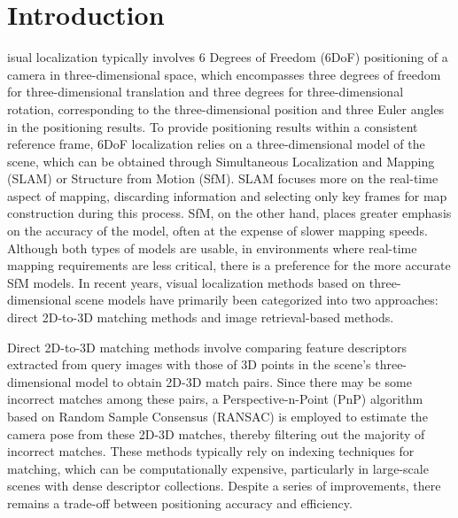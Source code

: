 \documentclass[journal]{IEEEtran}
\begin{document}
\section{Introduction}
isual localization typically involves 6 Degrees of Freedom (6DoF) positioning of a camera in three-dimensional space, which encompasses three degrees of freedom for three-dimensional translation and three degrees for three-dimensional rotation, corresponding to the three-dimensional position and three Euler angles in the positioning results. To provide positioning results within a consistent reference frame, 6DoF localization relies on a three-dimensional model of the scene, which can be obtained through Simultaneous Localization and Mapping (SLAM) or Structure from Motion (SfM). SLAM focuses more on the real-time aspect of mapping, discarding information and selecting only key frames for map construction during this process. SfM, on the other hand, places greater emphasis on the accuracy of the model, often at the expense of slower mapping speeds. Although both types of models are usable, in environments where real-time mapping requirements are less critical, there is a preference for the more accurate SfM models. In recent years, visual localization methods based on three-dimensional scene models have primarily been categorized into two approaches: direct 2D-to-3D matching methods and image retrieval-based methods.

Direct 2D-to-3D matching methods involve comparing feature descriptors extracted from query images with those of 3D points in the scene's three-dimensional model to obtain 2D-3D match pairs\cite{ref1,ref2}. Since there may be some incorrect matches among these pairs, a Perspective-n-Point (PnP) algorithm based on Random Sample Consensus (RANSAC) is employed to estimate the camera pose from these 2D-3D matches, thereby filtering out the majority of incorrect matches. These methods typically rely on indexing techniques for matching, which can be computationally expensive, particularly in large-scale scenes with dense descriptor collections. Despite a series of improvements, there remains a trade-off between positioning accuracy and efficiency\cite{ref3,ref4}.
\end{document}
